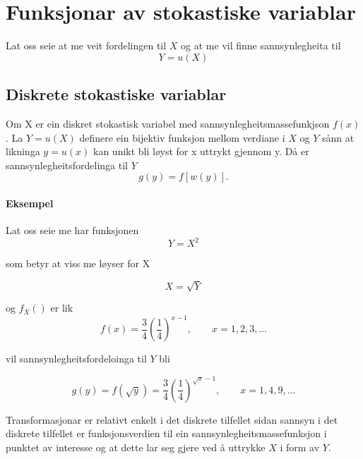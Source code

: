 \chapter{Funksjonar av stokastiske variablar}
Lat oss seie at me veit fordelingen til $X$ og at me vil finne sannsynlegheita til
\begin{equation}
    Y = u(X)
\end{equation}

\section{Diskrete stokastiske variablar}
Om X er ein diskret stokastisk variabel med sannsynlegheitsmassefunkjson $f(x)$. La $Y = u(X)$ definere ein bijektiv funksjon mellom verdiane i $X$ og $Y$ sånn at likninga $y = u(x)$ kan unikt bli løyst for x uttrykt gjennom y. Då er sannsynlegheitsfordelinga til $Y$
\begin{equation}
    g(y) = f[w(y)].
\end{equation}

\subsubsection{Eksempel}
Lat oss seie me har funksjonen
\begin{equation*}
    Y = X^2
\end{equation*}

som betyr at viss me løyser for X

\begin{equation*}
    X = \sqrt{Y}
\end{equation*}

og $f_X()$ er lik 
\begin{equation*}
    f(x) = \frac{3}{4}\left(\frac{1}{4} \right)^{x-1}, \qquad x = 1, 2, 3, \dots
\end{equation*}

vil sannsynlegheitsfordeloinga til $Y$ bli

\begin{equation*}
   g(y) = f(\sqrt{y}) =  \frac{3}{4}\left(\frac{1}{4} \right)^{\sqrt{x}-1}, \qquad x = 1, 4, 9, \dots
\end{equation*}

Transformasjonar er relativt enkelt i det diskrete tilfellet sidan sannsyn i det diskrete tilfellet er funksjonsverdien til ein sannsynlegheitsmassefunksjon i punktet av interesse og at dette lar seg gjere ved å uttrykke $X$ i form av $Y$. 

